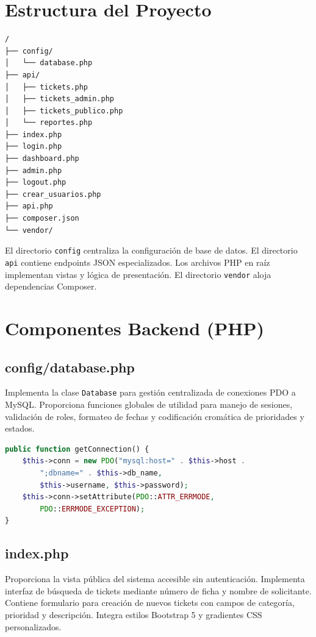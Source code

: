 \documentclass[12pt,a4paper]{article}
\begin{document}
\section{Estructura del Proyecto}

\begin{lstlisting}[language=bash,caption={Distribución de carpetas}]
/
├── config/
│   └── database.php
├── api/
│   ├── tickets.php
│   ├── tickets_admin.php
│   ├── tickets_publico.php
│   └── reportes.php
├── index.php
├── login.php
├── dashboard.php
├── admin.php
├── logout.php
├── crear_usuarios.php
├── api.php
├── composer.json
└── vendor/
\end{lstlisting}

El directorio \texttt{config} centraliza la configuración de base de datos. El directorio \texttt{api} contiene endpoints JSON especializados. Los archivos PHP en raíz implementan vistas y lógica de presentación. El directorio \texttt{vendor} aloja dependencias Composer.

\section{Componentes Backend (PHP)}

\subsection{config/database.php}

Implementa la clase \texttt{Database} para gestión centralizada de conexiones PDO a MySQL. Proporciona funciones globales de utilidad para manejo de sesiones, validación de roles, formateo de fechas y codificación cromática de prioridades y estados.

\begin{lstlisting}[language=PHP,caption={Clase Database}]
public function getConnection() {
    $this->conn = new PDO("mysql:host=" . $this->host . 
        ";dbname=" . $this->db_name, 
        $this->username, $this->password);
    $this->conn->setAttribute(PDO::ATTR_ERRMODE, 
        PDO::ERRMODE_EXCEPTION);
}
\end{lstlisting}

\subsection{index.php}

Proporciona la vista pública del sistema accesible sin autenticación. Implementa interfaz de búsqueda de tickets mediante número de ficha y nombre de solicitante. Contiene formulario para creación de nuevos tickets con campos de categoría, prioridad y descripción. Integra estilos Bootstrap 5 y gradientes CSS personalizados.
\end{document}
